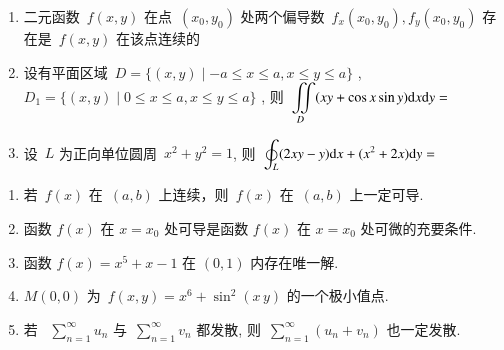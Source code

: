 \documentclass[twocolumn,landscape,fntef,UTF8]{ctexart}
\begin{document}
\begin{enumerate}
\item 二元函数~$f(x,y)$ 在点~$(x_0,y_0)$ 处两个偏导数~$f_x(x_0,y_0),f_y(x_0,y_0)$ 存在是~$f(x,y)$ 在该点连续的

\item 设有平面区域~$D=\{(x,y)\mid -a\leqslant x\leqslant a, x\leqslant y\leqslant a\}$ , ~$D_1=\{(x,y)\mid 0\leqslant x\leqslant a, x\leqslant y\leqslant a\}$ , 则~$\displaystyle{\iint\limits_{D}(xy+\cos x\sin y)\mathrm{d}x\mathrm{d}y}=$

\item 设~$L$ 为正向单位圆周~$x^2+y^2=1$, 则~$\displaystyle{\oint_L(2xy-y)\mathrm{d}x + (x^2 +2 x)\mathrm{d}y} = $
\end{enumerate}


\begin{enumerate}%
			
\item 若~$f(x)$ 在~$(a,b)$ 上连续，则~$f(x)$ 在~$(a,b)$ 上一定可导. \pdans{$\times$}%
\item 函数 $f(x)$ 在 $x=x_0$ 处可导是函数 $f(x)$ 在 $x=x_0$ 处可微的充要条件.\pdans{$\surd$}%
\item 函数 $f(x)=x^5+x-1$ 在 $(0,1)$ 内存在唯一解.\pdans{$\surd$}%
\item $M(0,0)$ 为~$f(x,y) = x^6 + \sin^2(x\,y)$ 的一个极小值点.\pdans{$\surd$}%
\item 若 ~$\sum\limits_{n=1}^\infty u_n$ 与~$\sum\limits_{n=1}^\infty v_n$ 都发散, 则~$\sum\limits_{n=1}^\infty (u_n+v_n)$ 也一定发散.\pdans{$\times$}%
\end{enumerate}
\end{document}
